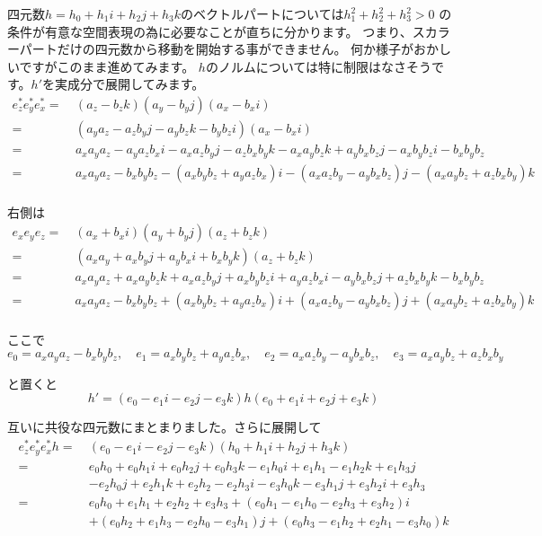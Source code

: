 \documentclass[a4paper,12pt]{jsreport}
\begin{document}
四元数$h=h_0+h_1i+h_2j+h_3k$のベクトルパートについては$h_1^2+h_2^2+h_3^2>0$
の条件が有意な空間表現の為に必要なことが直ちに分かります。
つまり、スカラーパートだけの四元数から移動を開始する事ができません。
何か様子がおかしいですがこのまま進めてみます。
$h$のノルムについては特に制限はなさそうです。$h'$を実成分で展開してみます。
\begin{equation}
\begin{split}
e_z^*e_y^*e_x^*=~&(a_z-b_zk)(a_y-b_yj)(a_x-b_xi)\\
=~&(a_ya_z-a_zb_yj-a_yb_zk-b_yb_zi)(a_x-b_xi)\\
=~&a_xa_ya_z-a_ya_zb_xi-a_xa_zb_yj-a_zb_xb_yk-a_xa_yb_zk+a_yb_xb_zj-a_xb_yb_zi-b_xb_yb_z\\
=~&a_xa_ya_z-b_xb_yb_z-(a_xb_yb_z+a_ya_zb_x)i-(a_xa_zb_y-a_yb_xb_z)j-(a_xa_yb_z+a_zb_xb_y)k\\
\end{split}
\end{equation}

右側は
\begin{equation}
\begin{split}
e_xe_ye_z=~&(a_x+b_xi)(a_y+b_yj)(a_z+b_zk)\\
=~&(a_xa_y+a_xb_yj+a_yb_xi+b_xb_yk)(a_z+b_zk)\\
=~&a_xa_ya_z+a_xa_yb_zk+a_xa_zb_yj+a_xb_yb_zi+a_ya_zb_xi-a_yb_xb_zj+a_zb_xb_yk-b_xb_yb_z\\
=~&a_xa_ya_z-b_xb_yb_z+(a_xb_yb_z+a_ya_zb_x)i+(a_xa_zb_y-a_yb_xb_z)j+(a_xa_yb_z+a_zb_xb_y)k\\
\end{split}
\end{equation}

ここで
\begin{equation}
e_0=a_xa_ya_z-b_xb_yb_z,\quad e_1=a_xb_yb_z+a_ya_zb_x,\quad e_2=a_xa_zb_y-a_yb_xb_z,\quad e_3=a_xa_yb_z+a_zb_xb_y
\end{equation}

と置くと
\begin{equation}
h'=(e_0-e_1i-e_2j-e_3k)h(e_0+e_1i+e_2j+e_3k)
\end{equation}

互いに共役な四元数にまとまりました。さらに展開して
\begin{equation}
\begin{split}
e_z^*e_y^*e_x^*h=~&(e_0-e_1i-e_2j-e_3k)(h_0+h_1i+h_2j+h_3k)\\
=~&e_0h_0+e_0h_1i+e_0h_2j+e_0h_3k-e_1h_0i+e_1h_1-e_1h_2k+e_1h_3j\\
&-e_2h_0j+e_2h_1k+e_2h_2-e_2h_3i-e_3h_0k-e_3h_1j+e_3h_2i+e_3h_3\\
=~&e_0h_0+e_1h_1+e_2h_2+e_3h_3+(e_0h_1-e_1h_0-e_2h_3+e_3h_2)i\\
&+(e_0h_2+e_1h_3-e_2h_0-e_3h_1)j+(e_0h_3-e_1h_2+e_2h_1-e_3h_0)k\\
\end{split}
\end{equation}
\end{document}
